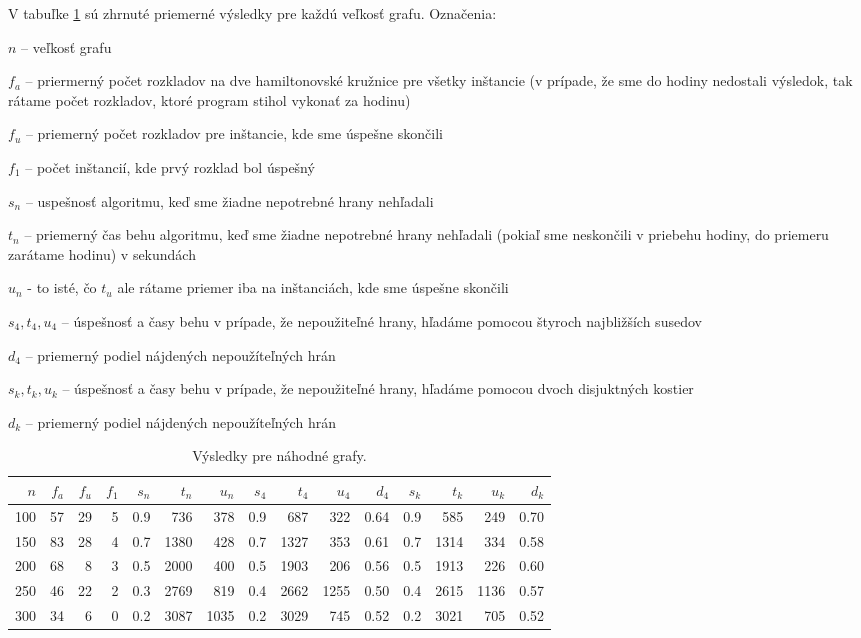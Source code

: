 V tabuľke \ref{table1} sú zhrnuté priemerné výsledky pre každú veľkosť grafu.
Označenia: 
\begin{myitemize}
\item $n$ -- veľkosť grafu
\item $f_a$ -- priermerný počet rozkladov na dve hamiltonovské kružnice pre všetky
inštancie (v prípade, že sme do hodiny nedostali výsledok, tak rátame počet rozkladov, ktoré program
stihol vykonať za hodinu)
\item $f_u$ -- priemerný počet rozkladov pre inštancie, kde sme úspešne skončili
\item $f_1$ -- počet inštancií, kde prvý rozklad bol úspešný 
\item $s_n$ -- uspešnosť algoritmu, keď sme žiadne nepotrebné hrany nehľadali
\item $t_n$ -- priemerný čas behu algoritmu, keď sme žiadne nepotrebné hrany nehľadali (pokiaľ sme
neskončili v priebehu hodiny, do priemeru zarátame hodinu) v sekundách
\item $u_n$ - to isté, čo $t_u$ ale rátame priemer iba na inštanciách, kde sme úspešne skončili
\item $s_4, t_4, u_4$ -- úspešnosť a časy behu v prípade, že nepoužiteľné hrany, hľadáme pomocou
štyroch najbližších susedov
\item $d_4$ -- priemerný podiel nájdených nepoužíteľných hrán
\item $s_k, t_k, u_k$ -- úspešnosť a časy behu v prípade, že nepoužiteľné hrany, hľadáme pomocou
dvoch disjuktných kostier
\item $d_k$ -- priemerný podiel nájdených nepoužíteľných hrán
\end{myitemize}



\begin{table}[h]
\centering
\begin{tabular}{|r|r|r|r|r|r|r|r|r|r|r|r|r|r|r|}
\hline
$n$&$f_a$&$f_u$&$f_1$&$s_n$&$t_n$&$u_n$&$s_4$&$t_4$&$u_4$&$d_4$&$s_k$&$t_k$&$u_k$&$d_k$ \\\hline
100& 57  & 29  & 5   & 0.9 & 736 & 378 & 0.9 & 687 & 322 & 0.64& 0.9 & 585 & 249 & 0.70 \\\hline
150& 83  & 28  & 4   & 0.7 & 1380& 428 & 0.7 & 1327& 353 & 0.61& 0.7 & 1314& 334 & 0.58 \\\hline
200& 68  & 8   & 3   & 0.5 & 2000& 400 & 0.5 & 1903& 206 & 0.56& 0.5 & 1913& 226 & 0.60 \\\hline
250& 46  & 22  & 2   & 0.3 & 2769& 819 & 0.4 & 2662& 1255& 0.50& 0.4 & 2615& 1136& 0.57 \\\hline
300& 34  & 6   & 0   & 0.2 & 3087& 1035& 0.2 & 3029& 745 & 0.52& 0.2 & 3021& 705 & 0.52 \\\hline
\end{tabular}
\caption{Výsledky pre náhodné grafy.}
\label{table1}
\end{table}

